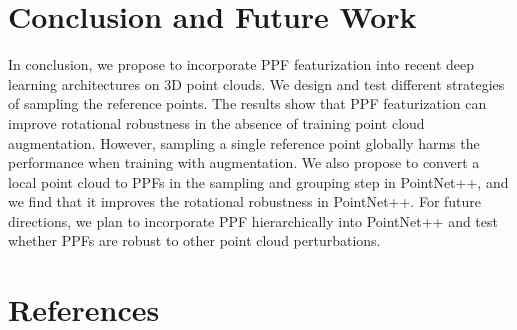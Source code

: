 \documentclass{article}
\begin{document}
\section{Conclusion and Future Work}

In conclusion, we propose to incorporate PPF featurization into recent deep learning architectures on 3D point clouds. We design and test different strategies of sampling the reference points. The results show that PPF featurization can improve rotational robustness in the absence of training point cloud augmentation. However, sampling a single reference point globally harms the performance when training with augmentation. We also propose to convert a local point cloud to PPFs in the sampling and grouping step in PointNet++, and we find that it improves the rotational robustness in PointNet++. For future directions, we plan to incorporate PPF hierarchically into PointNet++ and test whether PPFs are robust to other point cloud perturbations.





\clearpage

\section{References}


\end{document}
